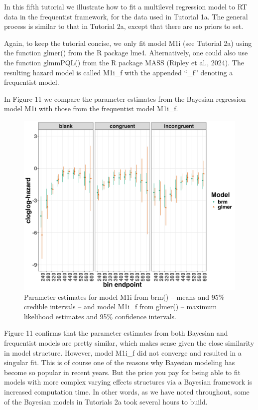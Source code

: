 \documentclass[
  man, donotrepeattitle,floatsintext]{apa6}
\begin{document}
In this fifth tutorial we illustrate how to fit a multilevel regression model to RT data in the frequentist framework, for the data used in Tutorial 1a. The general process is similar to that in Tutorial 2a, except that there are no priors to set.

Again, to keep the tutorial concise, we only fit model M1i (see Tutorial 2a) using the function glmer() from the R package lme4. Alternatively, one could also use the function glmmPQL() from the R package MASS (Ripley et al., 2024). The resulting hazard model is called M1i\_f with the appended ``\_f'' denoting a frequentist model.

In Figure 11 we compare the parameter estimates from the Bayesian regression model M1i with those from the frequentist model M1i\_f.



\begin{figure}[H]

{\centering \includegraphics[width=0.8\linewidth,height=0.67\textheight,]{../Tutorial_3_Frequentist/comparison} 

}

\caption{Parameter estimates for model M1i from brm() -- means and 95\% credible intervals -- and model M1i\_f from glmer() -- maximum likelihood estimates and 95\% confidence intervals.}\label{fig:plot-comparison}
\end{figure}

Figure 11 confirms that the parameter estimates from both Bayesian and frequentist models are pretty similar, which makes sense given the close similarity in model structure. However, model M1i\_f did not converge and resulted in a singular fit. This is of course one of the reasons why Bayesian modeling has become so popular in recent years. But the price you pay for being able to fit models with more complex varying effects structures via a Bayesian framework is increased computation time. In other words, as we have noted throughout, some of the Bayesian models in Tutorials 2a took several hours to build.
\end{document}
